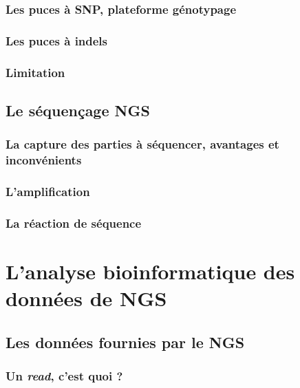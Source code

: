 \documentclass[12pt,a4paper,twoside]{ugathesis}
\begin{document}
\subsubsection{Les puces à SNP, plateforme
génotypage}\label{les-puces-a-snp-plateforme-genotypage}

\subsubsection{Les puces à indels}\label{les-puces-a-indels}

\subsubsection{Limitation}\label{limitation}

\subsection{Le séquençage NGS}\label{ngs}

\subsubsection{La capture des parties à séquencer, avantages et
inconvénients}\label{la-capture-des-parties-a-sequencer-avantages-et-inconvenients}

\subsubsection{L'amplification}\label{lamplification}

\subsubsection{La réaction de séquence}\label{la-reaction-de-sequence}

\section{L'analyse bioinformatique des données de
NGS}\label{lanalyse-bioinformatique-des-donnees-de-ngs}

\subsection{Les données fournies par le
NGS}\label{les-donnees-fournies-par-le-ngs}

\subsubsection{\texorpdfstring{Un \emph{read}, c'est quoi
?}{Un read, c'est quoi ?}}\label{un-read-cest-quoi}
\end{document}
